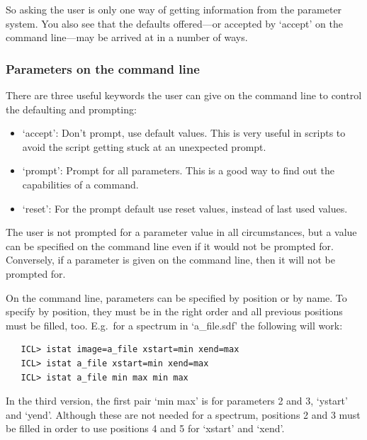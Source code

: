 \documentclass[11pt,twoside]{article}
\newcommand{\latorhtm}[2]{#1}
\newcommand{\latorhtm}[2]{#2}
\begin{document}
   So asking the user is only one way of getting information from the
   parameter system. You also see that the defaults offered\latorhtm{---}{-}or
   accepted by `accept' on the command line\latorhtm{---}{-}may be arrived
   at in a number of ways.


\subsubsection{\label{paramsonline}Parameters on the command line}

   There are three useful keywords the user can give on the command line
   to control the defaulting and prompting:

\begin{itemize}
\item
   `accept': Don't prompt, use default values. This is very useful in
   scripts to avoid the script getting stuck at an unexpected prompt.
\item
   `prompt': Prompt for all parameters. This is a good way to find out
   the capabilities of a command.
\item
   `reset': For the prompt default use reset values, instead of last
   used values.
\end{itemize}

   The user is not prompted for a parameter value in all circumstances,
   but a value can be specified on the command line even if it would not
   be prompted for.  Conversely, if a parameter is given on the command
   line, then it will not be prompted for.

   On the command line, parameters can be specified by position or by
   name. To specify by position, they must be in the right order and all
   previous positions must be filled, too. E.g.\ for a spectrum in
   `a\_file.sdf' the following will work:

\begin{verbatim}
   ICL> istat image=a_file xstart=min xend=max
   ICL> istat a_file xstart=min xend=max
   ICL> istat a_file min max min max
\end{verbatim}

   In the third version, the first pair `min max' is for parameters 2
   and 3, `ystart' and `yend'. Although these are not needed for a
   spectrum, positions 2 and 3 must be filled in order to use positions
   4 and 5 for `xstart' and `xend'.
\end{document}
